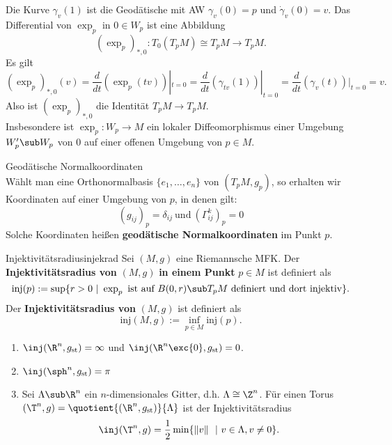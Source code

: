 \begin{bemerkung}
Die Kurve $\gamma_v(1)$ ist die Geodätische mit AW $\gamma_v(0)=p$ und $\dot{\gamma}_v(0)=v$. Das Differential von $\exp_p$ in $0 \in W_p$ ist eine Abbildung
\begin{equation}
(\exp_p)_{\ast,0}: T_0(T_pM) \cong T_pM \to T_pM.
\end{equation}
Es gilt
\begin{equation}
(\exp_p)_{\ast,0} (v) = \frac{d}{dt} (\exp_p(tv))|_{t=0} = \frac{d}{dt} (\gamma_{tv}(1))|_{t=0} = \frac{d}{dt}(\gamma_v (t))|_{t=0} = v.
\end{equation}
Also ist $(\exp_p)_{\ast,0}$ die Identität $T_pM \to T_pM$.\\
Insbesondere ist $\exp_p: W_p \to M$ ein lokaler Diffeomorphismus einer Umgebung $W_p' \sub W_p$ von $0$ auf einer offenen Umgebung von $p \in M$.
\end{bemerkung}
\begin{bemerkung}Geodätische Normalkoordinaten\\
Wählt man eine Orthonormalbasis $\{ e_1, \dots, e_n \}$ von $(T_pM, g_p)$, so erhalten wir Koordinaten auf einer Umgebung von $p$, in denen gilt:
\begin{equation}
(g_{ij})_p = \delta_{ij} \ \text{und} \ ( \Gamma_{ij}^k)_p = 0
\end{equation}
Solche Koordinaten heißen \textbf{geodätische Normalkoordinaten} im Punkt $p$.
\end{bemerkung}
\begin{definition}{Injektivitätsradius}{injekrad}
Sei $(M,g)$ eine Riemannsche MFK. Der \textbf{Injektivitätsradius von} $(M,g)$ \textbf{in einem Punkt} $p\in M$ ist definiert als
\begin{equation}
\text{inj}(p) := \sup \{ r > 0 \ | \ \exp_p \ \text{ist auf} \ B(0,r) \sub T_pM \ \text{definiert und dort injektiv} \}.
\end{equation} 
Der \textbf{Injektivitätsradius von} $(M,g)$ ist definiert als 
\begin{equation}
\text{inj}(M,g) := \inf_{p \in M} \text{inj}(p).
\end{equation}
\end{definition}
\begin{beispiele}
\begin{enumerate}
\item $\inj (\R^n, g_\text{st}) = \infty$ und $\inj (\R^n \exc \{0\}, g_\text{st}) = 0$.
\item $\inj (\sph^n, g_\text{st}) = \pi$
\item Sei $\Lambda \sub \R^n$ ein $n$-dimensionales Gitter, d.h. $\Lambda \cong \Z^n$. Für einen Torus $(\T^n,g) = \quotient{(\R^n, g_\text{st})}{\Lambda}$ ist der Injektivitätsradius
\begin{equation}
\inj (\T^n, g) = \frac{1}{2} \min \{ \| v \|\ \ | \ v \in \Lambda, v \neq 0 \}.
\end{equation}
\end{enumerate}
\end{beispiele}

